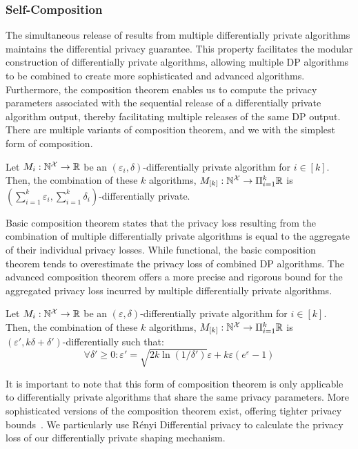 \subsubsection{Self-Composition}\label{subsubsec:background-dp-composition}
The simultaneous release of results from multiple differentially private algorithms maintains the differential privacy guarantee.
This property facilitates the modular construction of differentially private algorithms, allowing multiple DP algorithms to be combined to create more sophisticated and advanced algorithms.
Furthermore, the composition theorem enables us to compute the privacy parameters associated with the sequential release of a differentially private algorithm output, thereby facilitating multiple releases of the same DP output.
There are multiple variants of composition theorem, and we with the simplest form of composition.
\begin{proposition}
\label{prop:basic-composition}
  Let $M_i: \mathbb{N}^\mathcal{X} \rightarrow \mathbb{R}$ be an $(\varepsilon_i, \delta)$-differentially private algorithm for $i \in [k]$. Then, the combination of these $k$ algorithms, $M_{[k]}: \mathbb{N}^\mathcal{X} \rightarrow \Pi_{i=1}^{k}\mathbb{R}$ is $(\sum_{i=1}^{k}\varepsilon_i, \sum_{i=1}^{k}\delta_i)$-differentially private.  
\end{proposition}
Basic composition theorem states that the privacy loss resulting from the combination of multiple differentially private algorithms is equal to the aggregate of their individual privacy losses.
While functional, the basic composition theorem tends to overestimate the privacy loss of combined DP algorithms.
The advanced composition theorem offers a more precise and rigorous bound for the aggregated privacy loss incurred by multiple differentially private algorithms. 
\begin{proposition}
\label{prop:advanced-composition}
  Let $M_i: \mathbb{N}^\mathcal{X} \rightarrow \mathbb{R}$ be an $(\varepsilon, \delta)$-differentially private algorithm for $i \in [k]$. Then, the combination of these $k$ algorithms, $M_{[k]}: \mathbb{N}^\mathcal{X} \rightarrow \Pi_{i=1}^{k}\mathbb{R}$ is $(\varepsilon', k\delta+\delta')$-differentially such that:
  \begin{equation*}
    \forall \delta' \geq 0: \varepsilon' = \sqrt{2k\ln(1/\delta')}\varepsilon + k\varepsilon(e^{\varepsilon} - 1)
  \end{equation*}
\end{proposition}
It is important to note that this form of composition theorem is only applicable to differentially private algorithms that share the same privacy parameters.
More sophisticated versions of the composition theorem exist, offering tighter privacy bounds~\cite{kairouz2015composition, mironov2017renyi}.
We particularly use R{\'e}nyi Differential privacy to calculate the privacy loss of our differentially private shaping mechanism.

